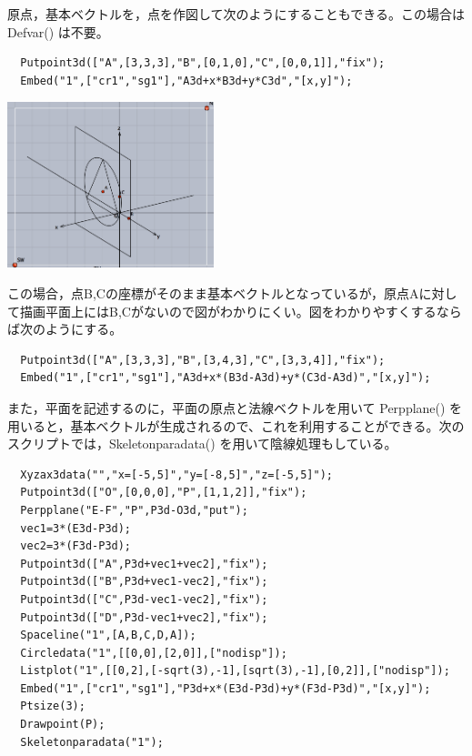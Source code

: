 \documentclass[papersize,a4paper,12pt,uplatex]{jsarticle}
\begin{document}
\begin{description}
原点，基本ベクトルを，点を作図して次のようにすることもできる。この場合は Defvar() は不要。

\begin{verbatim}
  Putpoint3d(["A",[3,3,3],"B",[0,1,0],"C",[0,0,1]],"fix");
  Embed("1",["cr1","sg1"],"A3d+x*B3d+y*C3d","[x,y]");
\end{verbatim}
\begin{center}
\includegraphics[bb=0 0 477.02 383.02 , width=6cm]{Fig/embed03.pdf}
\end{center}

この場合，点B,Cの座標がそのまま基本ベクトルとなっているが，原点Aに対して描画平面上にはB,Cがないので図がわかりにくい。図をわかりやすくするならば次のようにする。
\begin{verbatim}
  Putpoint3d(["A",[3,3,3],"B",[3,4,3],"C",[3,3,4]],"fix");
  Embed("1",["cr1","sg1"],"A3d+x*(B3d-A3d)+y*(C3d-A3d)","[x,y]");
\end{verbatim}

  また，平面を記述するのに，平面の原点と法線ベクトルを用いて Perpplane() を用いると，基本ベクトルが生成されるので、これを利用することができる。次のスクリプトでは，Skeletonparadata() を用いて陰線処理もしている。
\begin{verbatim}
  Xyzax3data("","x=[-5,5]","y=[-8,5]","z=[-5,5]");
  Putpoint3d(["O",[0,0,0],"P",[1,1,2]],"fix");
  Perpplane("E-F","P",P3d-O3d,"put");
  vec1=3*(E3d-P3d);
  vec2=3*(F3d-P3d);
  Putpoint3d(["A",P3d+vec1+vec2],"fix");
  Putpoint3d(["B",P3d+vec1-vec2],"fix");
  Putpoint3d(["C",P3d-vec1-vec2],"fix");
  Putpoint3d(["D",P3d-vec1+vec2],"fix");
  Spaceline("1",[A,B,C,D,A]);
  Circledata("1",[[0,0],[2,0]],["nodisp"]);
  Listplot("1",[[0,2],[-sqrt(3),-1],[sqrt(3),-1],[0,2]],["nodisp"]);
  Embed("1",["cr1","sg1"],"P3d+x*(E3d-P3d)+y*(F3d-P3d)","[x,y]");
  Ptsize(3);
  Drawpoint(P);
  Skeletonparadata("1");
\end{verbatim}
         \begin{center}  \end{center}


\end{description}
\end{document}
